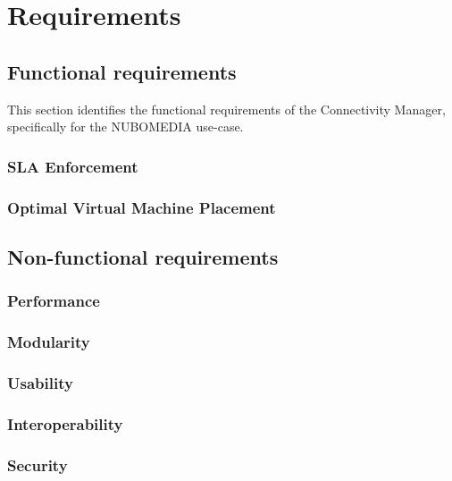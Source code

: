 \chapter{Requirements}

\section{Functional requirements}

This section identifies the functional requirements of the Connectivity Manager, specifically for the NUBOMEDIA use-case.

\subsection{SLA Enforcement}

\subsection{Optimal Virtual Machine Placement}

\section{Non-functional requirements}

\subsection{Performance}

\subsection{Modularity}

\subsection{Usability}

\subsection{Interoperability}

\subsection{Security}